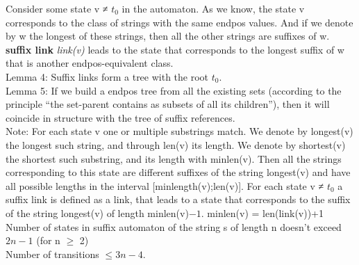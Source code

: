 \documentclass[8pt, a4paper, oneside, twocolumn]{extarticle}
\begin{document}
Consider some state v ≠ $t_0$ in the automaton. As we know, the state v corresponds to the class of strings with the same endpos values. And if we denote by w the longest of these strings, then all the other strings are suffixes of w. \textbf{suffix link} \textit{link(v)} leads to the state that corresponds to the longest suffix of w that is another endpos-equivalent class.\\
Lemma 4: Suffix links form a tree with the root $t_0$.\\
Lemma 5: If we build a endpos tree from all the existing sets (according to the principle “the set-parent contains as subsets of all its children”), then it will coincide in structure with the tree of suffix references.\\
Note: For each state v one or multiple substrings match. We denote by longest(v) the longest such string, and through len(v) its length. We denote by shortest(v) the shortest such substring, and its length with minlen(v). Then all the strings corresponding to this state are different suffixes of the string longest(v) and have all possible lengths in the interval [minlength(v);len(v)]. For each state v ≠ $t_0$ a suffix link is defined as a link, that leads to a state that corresponds to the suffix of the string longest(v) of length minlen(v)$ − 1$. minlen(v) = len(link(v))+1 \\
Number of states in suffix automaton of the string s of length n doesn't exceed $2n - 1$ (for n $\geq$ 2)\\
Number of transitions $\leq 3n - 4$.
\end{document}
